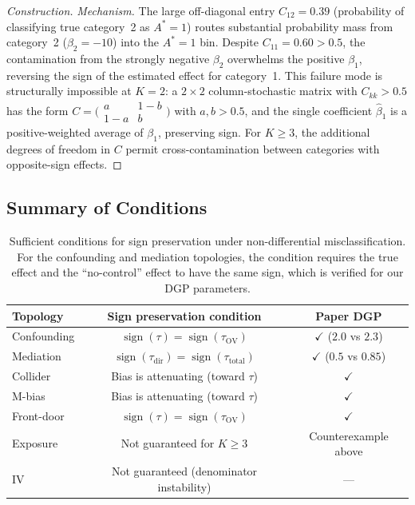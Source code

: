 \begin{proof}[Construction]
\emph{Mechanism.}
The large off-diagonal entry $C_{12}=0.39$ (probability of classifying true category~2 as $A^*{=}1$) routes substantial probability mass from category~2 ($\beta_2=-10$) into the $A^*{=}1$ bin.
Despite $C_{11}=0.60>0.5$, the contamination from the strongly negative $\beta_2$ overwhelms the positive $\beta_1$, reversing the sign of the estimated effect for category~1.
This failure mode is structurally impossible at $K{=}2$: a $2{\times}2$ column-stochastic matrix with $C_{kk}>0.5$ has the form $C=\bigl(\begin{smallmatrix}a&1{-}b\\1{-}a&b\end{smallmatrix}\bigr)$ with $a,b>0.5$, and the single coefficient $\hat\beta_1$ is a positive-weighted average of $\beta_1$, preserving sign.
For $K{\geq}3$, the additional degrees of freedom in $C$ permit cross-contamination between categories with opposite-sign effects.
\end{proof}

\subsection{Summary of Conditions}
\label{app:conditions}

\begin{table}[h]
\centering
\small
\begin{tabular}{lcc}
\toprule
\textbf{Topology} & \textbf{Sign preservation condition} & \textbf{Paper DGP} \\
\midrule
Confounding & $\operatorname{sign}(\tau)=\operatorname{sign}(\tau_{\mathrm{OV}})$ & $\checkmark$ ($2.0$ vs $2.3$)\\
Mediation & $\operatorname{sign}(\tau_{\mathrm{dir}})=\operatorname{sign}(\tau_{\mathrm{total}})$ & $\checkmark$ ($0.5$ vs $0.85$)\\
Collider & Bias is attenuating (toward $\tau$) & $\checkmark$ \\
M-bias & Bias is attenuating (toward $\tau$) & $\checkmark$ \\
Front-door & $\operatorname{sign}(\tau)=\operatorname{sign}(\tau_{\mathrm{OV}})$ & $\checkmark$ \\
\midrule
Exposure & Not guaranteed for $K\geq 3$ & Counterexample above \\
IV & Not guaranteed (denominator instability) & --- \\
\bottomrule
\end{tabular}
\caption{Sufficient conditions for sign preservation under non-differential misclassification.
For the confounding and mediation topologies, the condition requires the true effect and the ``no-control'' effect to have the same sign, which is verified for our DGP parameters.}
\label{tab:sign_conditions}
\end{table}

